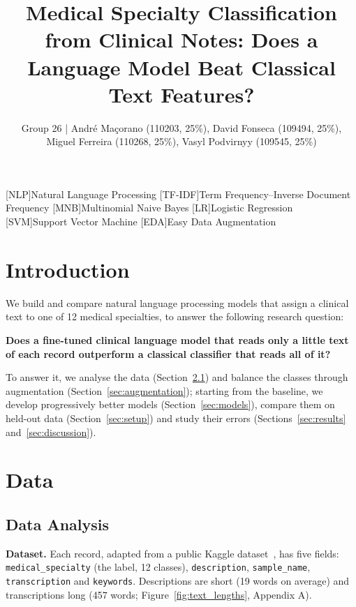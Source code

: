\documentclass[twocolumn,10pt]{article}
\title{Medical Specialty Classification from Clinical Notes: Does a Language Model Beat Classical Text Features?}
\author{Group 26 | André Maçorano (110203, 25\%), David Fonseca (109494, 25\%), Miguel Ferreira (110268, 25\%), Vasyl Podvirnyy (109545, 25\%)}
\date{}
\begin{document}
\raggedbottom  %

\maketitle

[NLP]{Natural Language Processing}
[TF-IDF]{Term Frequency--Inverse Document Frequency}
[MNB]{Multinomial Naive Bayes}
[LR]{Logistic Regression}
[SVM]{Support Vector Machine}
[EDA]{Easy Data Augmentation}

\section{Introduction}
\label{sec:intro}

We build and compare natural language processing models that assign a clinical text to one of 12 medical specialties, to answer the following research question:

\smallskip
\noindent\colorbox{black!8}{\parbox{\dimexpr\columnwidth-2\fboxsep\relax}{\textbf{Does a fine-tuned clinical language model that reads only a little text of each record outperform a classical classifier that reads all of it?}}}
\smallskip

To answer it, we analyse the data (Section~\ref{sec:analysis}) and balance the classes through augmentation (Section~\ref{sec:augmentation}); starting from the baseline, we develop progressively better models (Section~\ref{sec:models}), compare them on held-out data (Section~\ref{sec:setup}) and study their errors (Sections~\ref{sec:results} and~\ref{sec:discussion}).

\section{Data}
\label{sec:data}

\subsection{Data Analysis}
\label{sec:analysis}

\textbf{Dataset.} Each record, adapted from a public Kaggle dataset~\cite{kaggle}, has five fields: \texttt{medical\_specialty} (the label, 12 classes), \texttt{description}, \texttt{sample\_name}, \texttt{transcription} and \texttt{keywords}. Descriptions are short (19 words on average) and transcriptions long (457 words; Figure~\ref{fig:text_lengths}, Appendix A).
\end{document}
